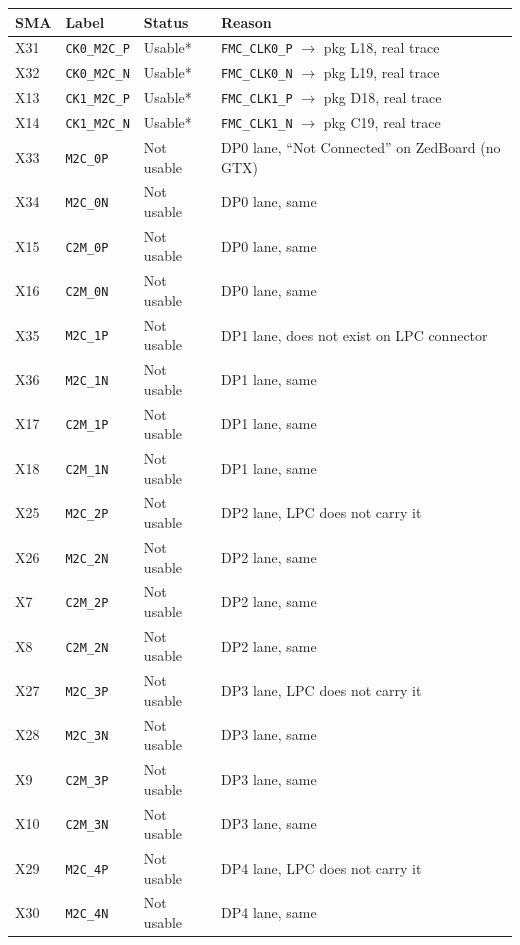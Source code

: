 \documentclass[11pt]{article}
\begin{document}
\begin{center}
\begin{tabular}{@{}llll@{}}
\toprule
\textbf{SMA} & \textbf{Label} & \textbf{Status} & \textbf{Reason} \\
\midrule
X31 & \texttt{CK0\_M2C\_P} & Usable* & \texttt{FMC\_CLK0\_P} $\to$ pkg L18, real trace \\
X32 & \texttt{CK0\_M2C\_N} & Usable* & \texttt{FMC\_CLK0\_N} $\to$ pkg L19, real trace \\
X13 & \texttt{CK1\_M2C\_P} & Usable* & \texttt{FMC\_CLK1\_P} $\to$ pkg D18, real trace \\
X14 & \texttt{CK1\_M2C\_N} & Usable* & \texttt{FMC\_CLK1\_N} $\to$ pkg C19, real trace \\
X33 & \texttt{M2C\_0P} & Not usable & DP0 lane, ``Not Connected'' on ZedBoard (no GTX) \\
X34 & \texttt{M2C\_0N} & Not usable & DP0 lane, same \\
X15 & \texttt{C2M\_0P} & Not usable & DP0 lane, same \\
X16 & \texttt{C2M\_0N} & Not usable & DP0 lane, same \\
X35 & \texttt{M2C\_1P} & Not usable & DP1 lane, does not exist on LPC connector \\
X36 & \texttt{M2C\_1N} & Not usable & DP1 lane, same \\
X17 & \texttt{C2M\_1P} & Not usable & DP1 lane, same \\
X18 & \texttt{C2M\_1N} & Not usable & DP1 lane, same \\
X25 & \texttt{M2C\_2P} & Not usable & DP2 lane, LPC does not carry it \\
X26 & \texttt{M2C\_2N} & Not usable & DP2 lane, same \\
X7  & \texttt{C2M\_2P} & Not usable & DP2 lane, same \\
X8  & \texttt{C2M\_2N} & Not usable & DP2 lane, same \\
X27 & \texttt{M2C\_3P} & Not usable & DP3 lane, LPC does not carry it \\
X28 & \texttt{M2C\_3N} & Not usable & DP3 lane, same \\
X9  & \texttt{C2M\_3P} & Not usable & DP3 lane, same \\
X10 & \texttt{C2M\_3N} & Not usable & DP3 lane, same \\
X29 & \texttt{M2C\_4P} & Not usable & DP4 lane, LPC does not carry it \\
X30 & \texttt{M2C\_4N} & Not usable & DP4 lane, same \\

\end{tabular}
\end{center}
\end{document}
